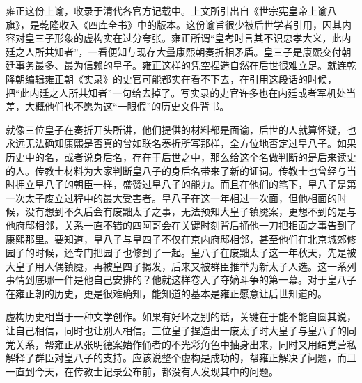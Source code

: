 
雍正这份上谕，收录于清代各官方记载中。上文所引出自《世宗宪皇帝上谕八旗》，是乾隆收入《四库全书》中的版本。这份谕旨很少被后世学者引用，因其内容对皇三子形象的虚构实在过分夸张。雍正所谓“皇考时言其不识忠孝大义，此内廷之人所共知者”，一看便知与现存大量康熙朝奏折相矛盾。皇三子是康熙交付朝廷事务最多、最为信赖的皇子。雍正这样的凭空捏造自然在后世很难立足。就连乾隆朝编辑雍正朝《实录》的史官可能都实在看不下去，在引用这段话的时候，把“此内廷之人所共知者”一句给去掉了。写实录的史官许多也在内廷或者军机处当差，大概他们也不愿为这“一眼假”的历史文件背书。



就像三位皇子在奏折开头所讲，他们提供的材料都是面谕，后世的人就算怀疑，也永远无法确知康熙是否真的曾如联名奏折所写那样，全方位地否定过皇八子。如果历史中的名，或者说身后名，存在于后世之中，那么给这个名做判断的是后来读史的人。传教士材料为大家判断皇八子的身后名带来了新的证词。传教士也曾经与当时拥立皇八子的朝臣一样，盛赞过皇八子的能力。而且在他们的笔下，皇八子是第一次太子废立过程中的最大受害者。皇八子在这一年相过一次面，但他相面的时候，没有想到不久后会有废黜太子之事，无法预知大皇子镇魇案，更想不到的是与他府邸相邻，关系一直不错的四阿哥会在关键时刻背后捅他一刀把相面之事告到了康熙那里。要知道，皇八子与皇四子不仅在京内府邸相邻，甚至他们在北京城郊修园子的时候，还专门把园子也修到了一起。皇八子在废黜太子这一年秋天，先是被大皇子用人偶镇魇，再被皇四子揭发，后来又被群臣推举为新太子人选。这一系列事情到底哪一件是他自己安排的？他就这样卷入了夺嫡斗争的第一幕。对于皇八子在雍正朝的历史，更是很难确知，能知道的基本是雍正愿意让后世知道的。



虚构历史相当于一种文学创作。如果有好坏之别的话，关键在于能不能自圆其说，让自己相信，同时也让别人相信。三位皇子捏造出一废太子时大皇子与皇八子的同党关系，帮雍正从张明德案始作俑者的不光彩角色中抽身出来，同时又用结党营私解释了群臣对皇八子的支持。应该说整个虚构是成功的，帮雍正解决了问题，而且一直到今天，在传教士记录公布前，都没有人发现其中的问题。


